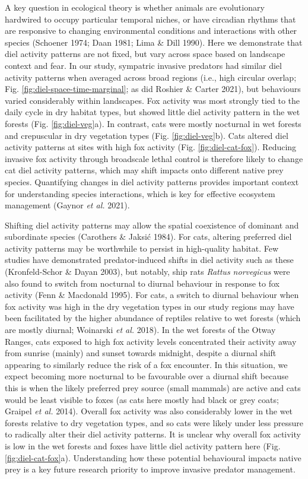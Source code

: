 \documentclass[11pt,a4paper,titlepage,twoside,openright]{style/unimelbthesis}
\begin{document}
\begin{mainmatter}
A key question in ecological theory is whether animals are evolutionary hardwired to occupy particular temporal niches, or have circadian rhythms that are responsive to changing environmental conditions and interactions with other species (Schoener 1974; Daan 1981; Lima \& Dill 1990). Here we demonstrate that diel activity patterns are not fixed, but vary across space based on landscape context and fear. In our study, sympatric invasive predators had similar diel activity patterns when averaged across broad regions (i.e., high circular overlap; Fig. \ref{fig:diel-space-time-marginal}; as did Roshier \& Carter 2021), but behaviours varied considerably within landscapes. Fox activity was most strongly tied to the daily cycle in dry habitat types, but showed little diel activity pattern in the wet forests (Fig. \ref{fig:diel-veg}a). In contrast, cats were mostly nocturnal in wet forests and crepuscular in dry vegetation types (Fig. \ref{fig:diel-veg}b). Cats altered diel activity patterns at sites with high fox activity (Fig. \ref{fig:diel-cat-fox}). Reducing invasive fox activity through broadscale lethal control is therefore likely to change cat diel activity patterns, which may shift impacts onto different native prey species. Quantifying changes in diel activity patterns provides important context for understanding species interactions, which is key for effective ecosystem management (Gaynor \emph{et al.} 2021).

Shifting diel activity patterns may allow the spatial coexistence of dominant and subordinate species (Carothers \& Jaksić 1984). For cats, altering preferred diel activity patterns may be worthwhile to persist in high-quality habitat. Few studies have demonstrated predator-induced shifts in diel activity such as these (Kronfeld-Schor \& Dayan 2003), but notably, ship rats \emph{Rattus norvegicus} were also found to switch from nocturnal to diurnal behaviour in response to fox activity (Fenn \& Macdonald 1995). For cats, a switch to diurnal behaviour when fox activity was high in the dry vegetation types in our study regions may have been facilitated by the higher abundance of reptiles relative to wet forests (which are mostly diurnal; Woinarski \emph{et al.} 2018). In the wet forests of the Otway Ranges, cats exposed to high fox activity levels concentrated their activity away from sunrise (mainly) and sunset towards midnight, despite a diurnal shift appearing to similarly reduce the risk of a fox encounter. In this situation, we expect becoming more nocturnal to be favourable over a diurnal shift because this is when the likely preferred prey source (small mammals) are active and cats would be least visible to foxes (as cats here mostly had black or grey coats; Graipel \emph{et al.} 2014). Overall fox activity was also considerably lower in the wet forests relative to dry vegetation types, and so cats were likely under less pressure to radically alter their diel activity patterns. It is unclear why overall fox activity is low in the wet forests and foxes have little diel activity pattern here (Fig. \ref{fig:diel-cat-fox}a). Understanding how these potential behavioural impacts native prey is a key future research priority to improve invasive predator management.


\end{mainmatter}
\end{document}
